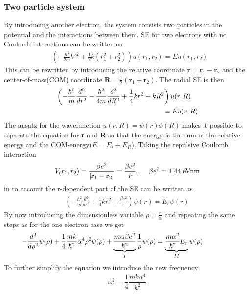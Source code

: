 \documentclass[twoside,twocolumn]{article}
\begin{document}
	\subsubsection{Two particle system}
	By introducing another electron, the system consists two particles in the potential and the interactions between them.
	SE for two electrons with no Coulomb interactions can be written as
	\begin{align*}
	&\left(  -\frac{\hbar^2}{2 m}\nabla^2+ \frac{1}{2}k(r_1^2+r_2^2)\right)u(r_1,r_2)= E u(r_1,r_2)\end{align*}
	This can be rewritten by introducing the relative coordinate $\textbf{r} = \textbf{r}_1-\textbf{r}_2$ and the center-of-mass(COM) coordinate $\textbf{R} = \frac{1}{2}(\textbf{r}_1 + \textbf{r}_2)$. The radial SE is then
	\begin{align*}
	&\left(  -\frac{\hbar^2}{m} \frac{d^2}{dr^2} -\frac{\hbar^2}{4 m} \frac{d^2}{dR^2}+ \frac{1}{4} k r^2+  kR^2\right)u(r,R)\\  &\hspace{5.5cm}= E u(r,R)
	\end{align*}
	The ansatz for the wavefunction $u(r,R) = \psi(r)\phi(R)$ makes it possible to separate the equation for \textbf{r} and \textbf{R} so that the energy is the sum of the relative energy and the COM-energy($E=E_r+E_R$).
	Taking the repulsive Coulomb interaction 
	\begin{align*}
	V_(r_1,r_2) = \dfrac{\beta e^2}{|\textbf{r}_1-\textbf{r}_2|} = \dfrac{\beta e^2}{r}, \hspace{0.5cm} \beta e^2 = 1.44\ \text{eVnm}
	\end{align*}
	in to account the r-dependent part of the SE can be written as
	\begin{align*}
	\left(  -\frac{\hbar^2}{m} \frac{d^2}{dr^2}+ \frac{1}{4}k r^2+\frac{\beta e^2}{r}\right)\psi(r)  = E_r \psi(r)
	\end{align*}
	By now introducing the dimensionless variable $\rho = \frac{r}{\alpha}$ and repeating the same steps as for the one electron case we get
	\begin{align*}
	\hspace{-1.5cm}-\dfrac{d^2}{d\rho^2} \psi(\rho) + \dfrac{1}{4}\frac{mk}{\hbar^2} \alpha^4\rho^2\psi(\rho)+\underbrace{\dfrac{m\alpha \beta e^2}{\hbar^2}}_{I}\dfrac{1}{\rho}\psi(\rho)  = \underbrace{ \dfrac{m\alpha^2}{\hbar^2}E_r}_{II}\psi(\rho)
	\end{align*}
	To further simplify the equation we introduce the new frequency
	\begin{align*}
	\omega_r^2 = \dfrac{1}{4}\dfrac{mk\alpha^4}{\hbar^2}
	\end{align*}
\end{document}
